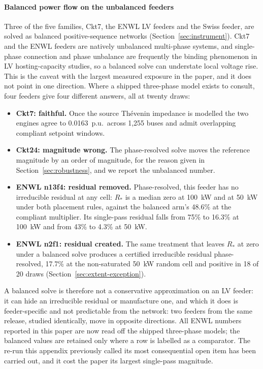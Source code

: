\documentclass[review,authoryear,12pt]{elsarticle}
\begin{document}
\paragraph{Balanced power flow on the unbalanced feeders} Three of the five
families, Ckt7, the ENWL LV feeders and the Swiss feeder, are solved as
balanced positive-sequence networks (Section~\ref{sec:instrument}). Ckt7 and
the ENWL feeders are natively unbalanced multi-phase systems, and single-phase
connection and phase unbalance are frequently the binding phenomenon in LV
hosting-capacity studies, so a balanced solve can understate local voltage
rise. This is the caveat with the largest measured exposure in the paper, and
it does not point in one direction. Where a shipped three-phase model exists to
consult, four feeders give four different answers, all at twenty draws:
\begin{itemize}
  \item \textbf{Ckt7: faithful.} Once the source Th\'evenin impedance is
    modelled the two engines agree to 0.0163~p.u.\ across 1{,}255 buses and
    admit overlapping compliant setpoint windows.
  \item \textbf{Ckt24: magnitude wrong.} The phase-resolved solve moves the
    reference magnitude by an order of magnitude, for the reason given in
    Section~\ref{sec:robustness}, and we report the unbalanced number.
  \item \textbf{ENWL n13f4: residual removed.} Phase-resolved, this feeder
    has no irreducible residual at any cell: $R_{\ast}$ is a median zero at
    100~kW and at 50~kW under both placement rules, against the balanced arm's
    48.6\% at the compliant multiplier. Its single-pass residual falls from
    75\% to 16.3\% at 100~kW and from 43\% to 4.3\% at 50~kW.
  \item \textbf{ENWL n2f1: residual created.} The same treatment that leaves
    $R_{\ast}$ at zero under a balanced solve produces a certified irreducible
    residual phase-resolved, 17.7\% at the non-saturated 50~kW random cell and
    positive in 18 of 20 draws (Section~\ref{sec:extent-exception}).
\end{itemize}
A balanced solve is therefore not a conservative approximation on an LV feeder:
it can hide an irreducible residual or manufacture one, and which it does is
feeder-specific and not predictable from the network: two feeders from
the same release, studied identically, move in opposite directions. All ENWL
numbers reported in this paper are now read off the shipped three-phase models;
the balanced values are retained only where a row is labelled as a comparator.
The re-run this appendix previously called its most consequential open item has
been carried out, and it cost the paper its largest single-pass magnitude.
\end{document}
